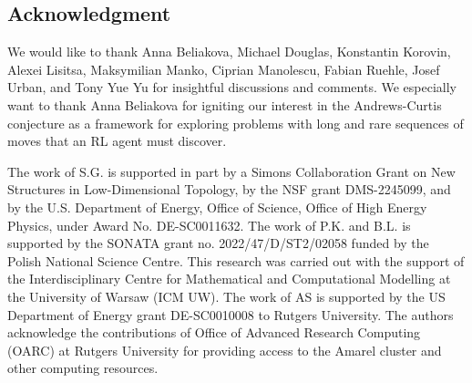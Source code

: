 
\subsection*{Acknowledgment}

We would like to thank Anna Beliakova, Michael Douglas, Konstantin Korovin, Alexei Lisitsa, Maksymilian Manko, Ciprian Manolescu, Fabian Ruehle, Josef Urban, and Tony Yue Yu for insightful discussions and comments. We especially want to thank Anna Beliakova for igniting our interest in the Andrews-Curtis conjecture as a framework for exploring problems with long and rare sequences of moves that an RL agent must discover.

The work of S.G. is supported in part by a Simons Collaboration Grant on New Structures in Low-Dimensional Topology, by the NSF grant DMS-2245099, and by the U.S. Department of Energy, Office of Science, Office of High Energy Physics, under Award No. DE-SC0011632. The work of P.K. and B.L. is supported by the SONATA grant no. 2022/47/D/ST2/02058 funded by the Polish National Science Centre. This research was carried out with the support of the Interdisciplinary Centre for Mathematical and Computational Modelling at the University of Warsaw (ICM UW). The work of AS is supported by the US Department of Energy grant DE-SC0010008 to Rutgers University. The authors acknowledge the contributions of Office of Advanced Research Computing (OARC) at Rutgers University for providing access to the Amarel cluster and other computing resources. 